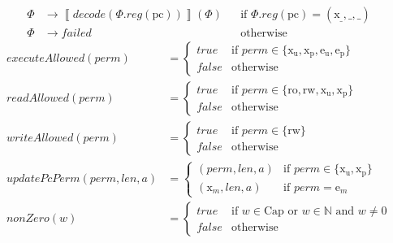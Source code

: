 \documentclass{article}
\newcommand{\var}[1]{\mathit{#1}}
\newcommand{\pcreg}{\mathrm{pc}}
\newcommand{\addr}{a}
\newcommand{\len}{len}
\newcommand{\reg}{reg}
\newcommand{\perm}{perm}
\newcommand{\failed}{failed}
\newcommand{\false}{\mathit{false}}
\newcommand{\true}{\mathit{true}}
\newcommand{\decode}{\mathit{decode}}
\newcommand{\updatePcPerm}{\mathit{updatePcPerm}}
\newcommand{\executeAllowed}{\mathit{executeAllowed}}
\newcommand{\nonZero}[1]{\mathit{nonZero}(#1)}
\newcommand{\readAllowed}[1]{\mathit{readAllowed}(#1)}
\newcommand{\writeAllowed}[1]{\mathit{writeAllowed}(#1)}
\newcommand{\plaindom}[1]{\mathrm{#1}}
\newcommand{\Caps}{\plaindom{Cap}}
\newcommand{\nats}{\mathbb{N}}
\newcommand{\plainperm}[1]{\mathrm{#1}}
\newcommand{\readonly}{\plainperm{ro}}
\newcommand{\readwrite}{\plainperm{rw}}
\newcommand{\exec}[1]{\plainperm{x_{#1}}}
\newcommand{\entry}[1]{\plainperm{e_{#1}}}
\newcommand{\sem}[1]{\left\llbracket #1 \right\rrbracket}
\begin{document}
\begin{align*}
\Phi & \rightarrow \sem{\decode(\Phi.\reg(\pcreg))}(\Phi) & & \text{if $\Phi.\reg(\pcreg) = (\exec{\_},{\_},{\_})$} \\
\Phi & \rightarrow \failed                                      & & \text{otherwise}
\end{align*}
\begin{align*}
  \executeAllowed(\perm) &=
                           \begin{cases}
                             \true & \text{if } \perm \in \{\exec{u},\exec{p},\entry{u},\entry{p}\} \\
                             \false & \text{otherwise}
                           \end{cases} \\
  \readAllowed{\perm} &=
                           \begin{cases}
                             \true & \text{if } \perm \in \{\readonly, \readwrite, \exec{u},\exec{p}\} \\
                             \false & \text{otherwise}
                           \end{cases} \\
  \writeAllowed{\perm} &=
                           \begin{cases}
                             \true & \text{if } \perm \in \{\readwrite\} \\
                             \false & \text{otherwise}
                           \end{cases} \\
  \updatePcPerm (\perm,\len,\addr) &=
                                     \begin{cases}
                                       (\perm,\len,\addr) & \text{if $\perm\in\{\exec{u},\exec{p}\}$} \\
                                       (\exec{\var{m}},\len,\addr) & \text{if $\perm = \entry{\var{m}}$}
                                     \end{cases} \\
  \nonZero{w} &=
                \begin{cases}
                  \true & \text{if $w\in \Caps$ or $w\in \nats$ and $w \neq 0$}\\
                  \false & \text{otherwise}
                \end{cases}
\end{align*}
\end{document}
